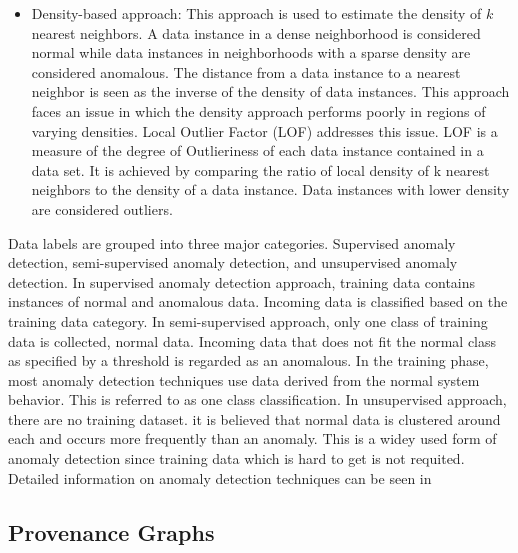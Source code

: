 \begin{itemize}[noitemsep,wide=0pt, leftmargin=\dimexpr{} + 2\relax]
\item Density-based approach: This approach is used to estimate the density of  $k$ nearest neighbors. A data instance in a dense neighborhood is considered normal while data instances in neighborhoods with a sparse density are considered anomalous. The distance from a data instance to a nearest neighbor is seen as the inverse of the density of data instances.  This approach faces an issue in which the density approach performs poorly in regions of varying densities. Local Outlier Factor (LOF) addresses this issue. LOF is a measure of the degree of Outlieriness of each data instance contained in a data set. It is achieved by comparing the ratio of local density of k nearest neighbors to the density of a data instance. Data instances with lower density are considered outliers.

\end{itemize}    


Data labels are grouped into three major categories. Supervised anomaly detection, semi-supervised anomaly detection, and unsupervised anomaly detection. In supervised anomaly detection approach, training data contains instances of normal and anomalous data. Incoming data is classified based on the training data category. In semi-supervised approach, only one class of training data is collected, normal data. Incoming data that does not fit the normal class as specified by a threshold is regarded as an anomalous. In the training phase, most anomaly detection techniques use data derived from the normal system behavior.  This is referred to as one class classification. In unsupervised approach, there are no training dataset. it is believed that normal data is clustered around each and occurs more frequently than an anomaly. This is a widey used form of anomaly detection since training data which is hard to get is not requited. Detailed information on anomaly detection techniques can be seen in \cite{chandola_anomaly_2009, Akoglu2015, hodge_survey_2004, zhang_outlier_2010}

 





\subsection{Provenance Graphs}

